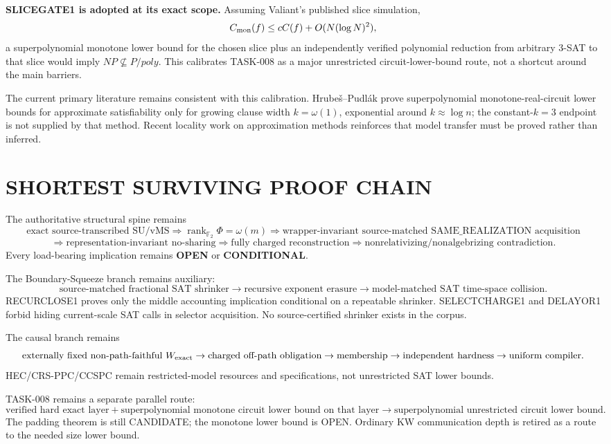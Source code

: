 \documentclass[11pt]{article}
\begin{document}
\textbf{SLICEGATE1 is adopted at its exact scope.} Assuming Valiant's published slice simulation,
\[
C_{\rm mon}(f)\le cC(f)+O(N(\log N)^2),
\]
a superpolynomial monotone lower bound for the chosen slice plus an independently verified polynomial reduction from arbitrary 3-SAT to that slice would imply $NP\not\subseteq P/poly$. This calibrates TASK-008 as a major unrestricted circuit-lower-bound route, not a shortcut around the main barriers.

The current primary literature remains consistent with this calibration. Hrube\v{s}--Pudl\'ak prove superpolynomial monotone-real-circuit lower bounds for approximate satisfiability only for growing clause width $k=\omega(1)$, exponential around $k\approx\log n$; the constant-$k=3$ endpoint is not supplied by that method. Recent locality work on approximation methods reinforces that model transfer must be proved rather than inferred.

\section*{SHORTEST SURVIVING PROOF CHAIN}
The authoritative structural spine remains
\[
\text{exact source-transcribed SU/vMS}
\Longrightarrow
\operatorname{rank}_{\mathbb F_2}\Phi=\omega(m)
\Longrightarrow
\text{wrapper-invariant source-matched SAME\_REALIZATION acquisition}
\]
\[
\Longrightarrow
\text{representation-invariant no-sharing}
\Longrightarrow
\text{fully charged reconstruction}
\Longrightarrow
\text{nonrelativizing/nonalgebrizing contradiction}.
\]
Every load-bearing implication remains \textbf{OPEN} or \textbf{CONDITIONAL}.

The Boundary-Squeeze branch remains auxiliary:
\[
\text{source-matched fractional SAT shrinker}
\to
\text{recursive exponent erasure}
\to
\text{model-matched SAT time-space collision}.
\]
RECURCLOSE1 proves only the middle accounting implication conditional on a repeatable shrinker. SELECTCHARGE1 and DELAYOR1 forbid hiding current-scale SAT calls in selector acquisition. No source-certified shrinker exists in the corpus.

The causal branch remains
\[
\text{externally fixed non-path-faithful }W_{\rm exact}
\to
\text{charged off-path obligation}
\to
\text{membership}
\to
\text{independent hardness}
\to
\text{uniform compiler}.
\]
HEC/CRS-PPC/CCSPC remain restricted-model resources and specifications, not unrestricted SAT lower bounds.

TASK-008 remains a separate parallel route:
\[
\text{verified hard exact layer}
+
\text{superpolynomial monotone circuit lower bound on that layer}
\to
\text{superpolynomial unrestricted circuit lower bound}.
\]
The padding theorem is still CANDIDATE; the monotone lower bound is OPEN. Ordinary KW communication depth is retired as a route to the needed size lower bound.
\end{document}

